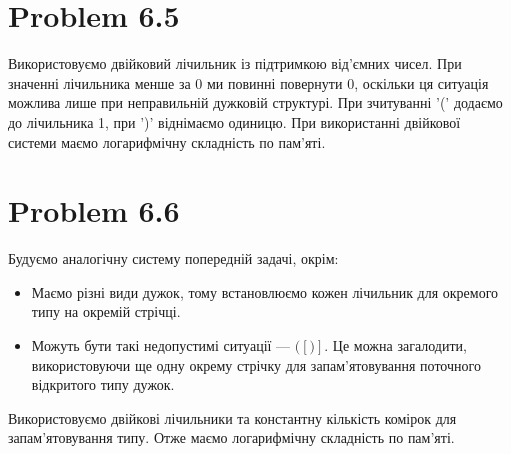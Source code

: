 \documentclass[12pt,letterpaper]{article}
\begin{document}
\section{Problem 6.5}

Використовуємо двійковий лічильник із підтримкою від'ємних чисел. При значенні лічильника менше за 0 ми повинні повернути 0, оскільки ця ситуація можлива лише при неправильній дужковій структурі. При зчитуванні '(' додаємо до лічильника 1, при ')' віднімаємо одиницю. При використанні двійкової системи маємо логарифмічну складність по пам'яті.

\section{Problem 6.6}

Будуємо аналогічну систему попередній задачі, окрім:
\begin{itemize}
    \item Маємо різні види дужок, тому встановлюємо кожен лічильник для окремого типу на окремій стрічці.
    \item Можуть бути такі недопустимі ситуації --- $([)]$. Це можна загалодити, використовуючи ще одну окрему стрічку для запам'ятовування поточного відкритого типу дужок.
\end{itemize}
Використовуємо двійкові лічильники та константну кількість комірок для запам'ятовування типу. Отже маємо логарифмічну складність по пам'яті.

\end{document}
